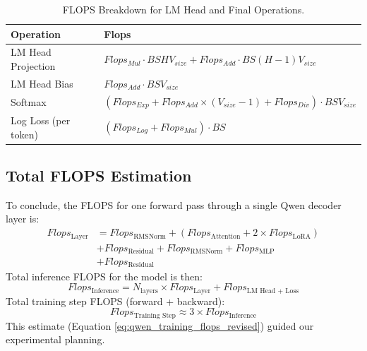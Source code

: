 \documentclass{article}
\begin{document}
\begin{table}[!thbp]
\renewcommand{\arraystretch}{1.4} \centering \setlength{\tabcolsep}{8pt}
\begin{tabular}{@{}ll@{}} %
    \toprule \textbf{Operation} & \textbf{Flops} \\ \midrule
    LM Head Projection & $Flops_{Mul} \cdot BSH V_{size} + Flops_{Add} \cdot BS(H - 1) V_{size}$ \\
    LM Head Bias & $Flops_{Add} \cdot BS V_{size}$ \\ %
    Softmax & $(Flops_{Exp} + Flops_{Add} \times (V_{size}-1) + Flops_{Div}) \cdot BS V_{size}$ \\ %
    Log Loss (per token) & $(Flops_{Log} + Flops_{Mul}) \cdot BS$ \\ %
    \bottomrule
\end{tabular}
\caption{FLOPS Breakdown for LM Head and Final Operations.} \label{tab:lm_head_flops}
\end{table}

\subsection{Total FLOPS Estimation}

To conclude, the FLOPS for one forward pass through a single Qwen decoder layer is:
\begin{align}
Flops_{\text{Layer}} &= Flops_{\text{RMSNorm}} + (Flops_{\text{Attention}} + 2 \times Flops_{\text{LoRA}}) \nonumber \\
                     &+ Flops_{\text{Residual}} + Flops_{\text{RMSNorm}} + Flops_{\text{MLP}} \nonumber \\
                     &+ Flops_{\text{Residual}} \label{eq:qwen_layer_flops}
\end{align}
Total inference FLOPS for the model is then:
\begin{equation}
Flops_{\text{Inference}} = N_{\text{layers}} \times Flops_{\text{Layer}} + Flops_{\text{LM Head + Loss}}
\label{eq:qwen_inference_flops_revised}
\end{equation}
Total training step FLOPS (forward + backward):
\begin{equation}
Flops_{\text{Training Step}} \approx 3 \times Flops_{\text{Inference}}
\label{eq:qwen_training_flops_revised}
\end{equation}
This estimate (Equation \ref{eq:qwen_training_flops_revised}) guided our experimental planning.
\end{document}
